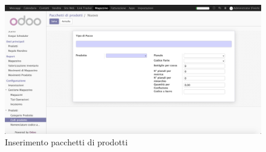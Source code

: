 \begin{figure}[H]
	\begin{center} \includegraphics[scale=0.3]{figures/product_packagin}
		\caption[Inserimento pacchetti di prodotti]{Inserimento pacchetti di prodotti}
		\label{fig:product_packagin}
	\end{center}
\end{figure}

